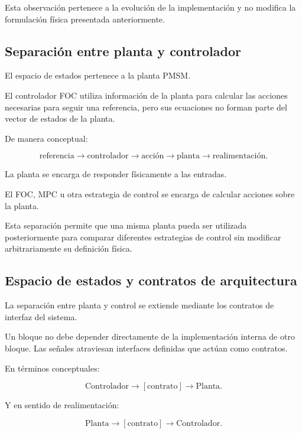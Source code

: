 Esta observación pertenece a la evolución de la implementación y no modifica la formulación física presentada anteriormente.

\subsection{Separación entre planta y controlador}

El espacio de estados pertenece a la planta PMSM.

El controlador FOC utiliza información de la planta para calcular las acciones necesarias para seguir una referencia, pero sus ecuaciones no forman parte del vector de estados de la planta.

De manera conceptual:

\begin{equation}
\text{referencia}
\rightarrow
\text{controlador}
\rightarrow
\text{acción}
\rightarrow
\text{planta}
\rightarrow
\text{realimentación}.
\end{equation}

La planta se encarga de responder físicamente a las entradas.

El FOC, MPC u otra estrategia de control se encarga de calcular acciones sobre la planta.

Esta separación permite que una misma planta pueda ser utilizada posteriormente para comparar diferentes estrategias de control sin modificar arbitrariamente su definición física.

\subsection{Espacio de estados y contratos de arquitectura}

La separación entre planta y control se extiende mediante los contratos de interfaz del sistema.

Un bloque no debe depender directamente de la implementación interna de otro bloque. Las señales atraviesan interfaces definidas que actúan como contratos.

En términos conceptuales:

\begin{equation}
\text{Controlador}
\rightarrow
[\text{contrato}]
\rightarrow
\text{Planta}.
\end{equation}

Y en sentido de realimentación:

\begin{equation}
\text{Planta}
\rightarrow
[\text{contrato}]
\rightarrow
\text{Controlador}.
\end{equation}

